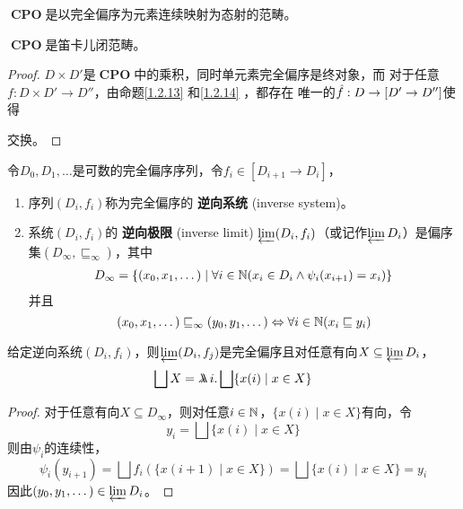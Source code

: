 \documentclass[11pt]{article}
\DeclareMathOperator{\CPO}{\textbf{CPO}}
\begin{document}
\begin{definition}[]
\(\CPO\)是以完全偏序为元素连续映射为态射的范畴。
\end{definition}

\begin{theorem}[]
\(\CPO\)是笛卡儿闭范畴。
\end{theorem}

\begin{proof}
\(D\times D'\)是\(\CPO\)中的乘积，同时单元素完全偏序是终对象，而
对于任意\(f:D\times D'\to D''\)，由命题\ref{1.2.13} 和\ref{1.2.14} ，都存在
唯一的\(\hat{f}:D\to[D'\to D'']\)使得
\begin{center}\end{center}
交换。
\end{proof}

\begin{definition}[]
令\(D_0,D_1,\dots\)是可数的完全偏序序列，令\(f_i\in[D_{i+1}\to D_i]\)，
\begin{enumerate}
\item 序列\((D_i,f_i)\)称为完全偏序的 \textbf{逆向系统} (inverse system)。
\item 系统\((D_i,f_i)\)的 \textbf{逆向极限} (inverse limit) \(\varprojlim(D_i,f_i)\)（或记作\(\varprojlim D_i\)）是偏序集\((D_\infty,\sqsubseteq_\infty)\)，其中
\begin{align*}
D_\infty=\{(x_0,x_1,\dots)\mid\forall i\in\mathbb{N}(x_i\in D_i\wedge\psi_i(x_{i+1})=x_i)\}
\end{align*}
并且
\begin{equation*}
(x_0,x_1,\dots)\sqsubseteq_\infty(y_0,y_1,\dots)\Leftrightarrow\forall i\in\mathbb{N}(x_i\sqsubseteq y_i)
\end{equation*}
\end{enumerate}
\end{definition}

\begin{proposition}[]
给定逆向系统\((D_i,f_i)\)，则\(\varprojlim(D_i,f_j)\)是完全偏序且对任意有向\(X\subseteq\varprojlim D_i\)，
\begin{equation*}
\bigsqcup X=\metalambda i.\bigsqcup\{x(i)\mid x\in X\}
\end{equation*}
\end{proposition}

\begin{proof}
对于任意有向\(X\subseteq D_\infty\)，则对任意\(i\in\mathbb{N}\)，\(\{x(i)\mid x\in X\}\)有向，令
\begin{equation*}
y_i=\bigsqcup\{x(i)\mid x\in X\}
\end{equation*}
则由\(\psi_i\)的连续性，
\begin{equation*}
\psi_i(y_{i+1})=\bigsqcup f_i(\{x(i+1)\mid x\in X\})=\bigsqcup\{x(i)\mid x\in X\}=y_i
\end{equation*}
因此\((y_0,y_1,\dots)\in \varprojlim D_i\)。
\end{proof}
\end{document}
